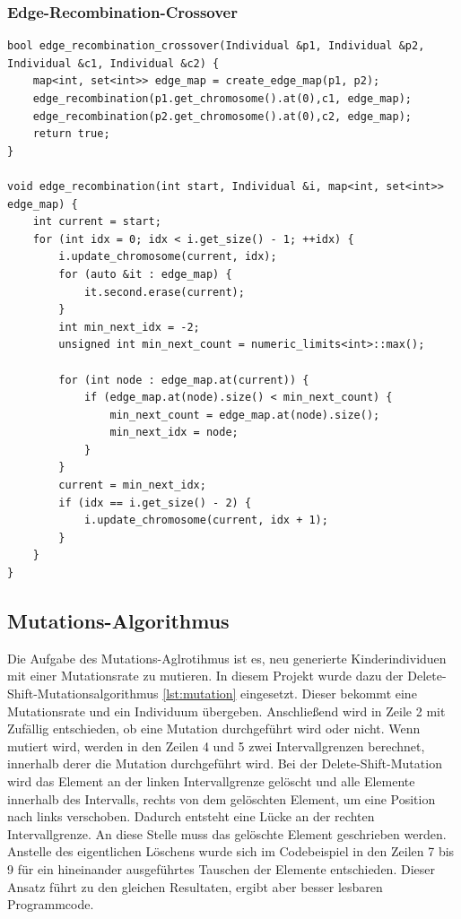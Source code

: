 \subsubsection{Edge-Recombination-Crossover}
\begin{minipage}{\linewidth}
\begin{lstlisting}[caption={Edge-Recombination-Crossover}, firstnumber=1, captionpos=b, label=lst:erx]
bool edge_recombination_crossover(Individual &p1, Individual &p2, Individual &c1, Individual &c2) {
	map<int, set<int>> edge_map = create_edge_map(p1, p2);
	edge_recombination(p1.get_chromosome().at(0),c1, edge_map);
	edge_recombination(p2.get_chromosome().at(0),c2, edge_map);
	return true;
}

void edge_recombination(int start, Individual &i, map<int, set<int>> edge_map) {
	int current = start;
	for (int idx = 0; idx < i.get_size() - 1; ++idx) {
		i.update_chromosome(current, idx);
		for (auto &it : edge_map) {
			it.second.erase(current);
		}
		int min_next_idx = -2;
		unsigned int min_next_count = numeric_limits<int>::max();

		for (int node : edge_map.at(current)) {
			if (edge_map.at(node).size() < min_next_count) {
				min_next_count = edge_map.at(node).size();
				min_next_idx = node;
			}
		}
		current = min_next_idx;
		if (idx == i.get_size() - 2) {
			i.update_chromosome(current, idx + 1);
		}
	}
}
\end{lstlisting}
\end{minipage}

\subsection{Mutations-Algorithmus}
Die Aufgabe des Mutations-Aglrotihmus ist es, neu generierte Kinderindividuen mit einer Mutationsrate zu mutieren.
In diesem Projekt wurde dazu der Delete-Shift-Mutationsalgorithmus \ref{lst:mutation} eingesetzt. Dieser bekommt eine Mutationsrate und ein Individuum übergeben.
Anschließend wird in Zeile 2 mit Zufällig entschieden, ob eine Mutation durchgeführt wird oder nicht. Wenn mutiert wird, werden in den Zeilen 4 und 5 zwei Intervallgrenzen berechnet, innerhalb derer die Mutation durchgeführt wird.
Bei der Delete-Shift-Mutation wird das Element an der linken Intervallgrenze gelöscht und alle Elemente innerhalb des Intervalls, rechts von dem gelöschten Element, um eine Position nach links verschoben. Dadurch entsteht eine Lücke an der rechten Intervallgrenze. An diese Stelle muss das gelöschte Element geschrieben werden. Anstelle des eigentlichen Löschens wurde sich im Codebeispiel in den Zeilen 7 bis 9 für ein hineinander ausgeführtes Tauschen der Elemente entschieden. Dieser Ansatz führt zu den gleichen Resultaten, ergibt aber besser lesbaren Programmcode.

